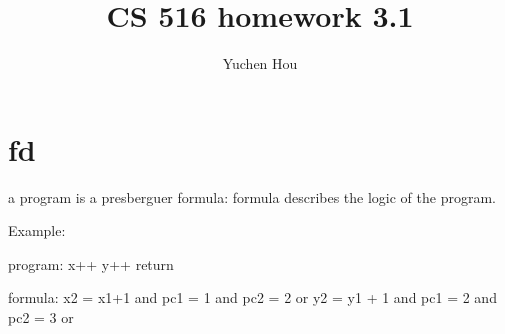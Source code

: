 \documentclass{article}
\begin{document}
\lstset{language=python, tabsize=4}
\title{CS 516 homework 3.1}
\author{Yuchen Hou}
\maketitle

\section{fd}
a program is a presberguer formula:
formula describes the logic of the program.

Example:

program:
x++
y++
return

formula:
x2 = x1+1 and pc1 = 1 and pc2 = 2
or
y2 = y1 + 1 and pc1 = 2 and pc2 = 3
or
\end{document}
